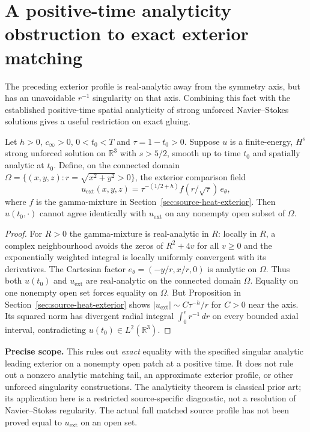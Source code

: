 
\section{A positive-time analyticity obstruction to exact exterior matching}
\label{sec:analytic-no-exact-gluing}
The preceding exterior profile is real-analytic away from the symmetry
axis, but has an unavoidable $r^{-1}$ singularity on that axis.
Combining this fact with the established positive-time spatial
analyticity of strong unforced Navier--Stokes solutions
\cite{zhang2026analyticity} gives a useful restriction on exact gluing.

\begin{theorem}
Let $h>0$, $c_\infty>0$, $0<t_0<T$ and $\tau=1-t_0>0$.
Suppose $u$ is a finite-energy, $H^s$ strong unforced solution
on $\mathbb R^3$ with $s>5/2$, smooth up to time $t_0$ and
spatially analytic at $t_0$. Define, on the connected domain
$\Omega=\{(x,y,z):r=\sqrt{x^2+y^2}>0\}$, the exterior comparison field
\[
u_{\mathrm{ext}}(x,y,z)=
\tau^{-(1/2+h)} f(r/\sqrt\tau)\,e_\theta,
\]
where $f$ is the gamma-mixture in Section~\ref{sec:source-heat-exterior}.
Then $u(t_0,\cdot)$ cannot agree identically with
$u_{\mathrm{ext}}$ on any nonempty open subset of $\Omega$.
\end{theorem}
\begin{proof}
For $R>0$ the gamma-mixture is real-analytic in $R$:
locally in $R$, a complex neighbourhood avoids the zeros of
$R^2+4v$ for all $v\ge0$ and the exponentially weighted integral
is locally uniformly convergent with its derivatives. The Cartesian
factor $e_\theta=(-y/r,x/r,0)$ is analytic on $\Omega$.
Thus both $u(t_0)$ and $u_{\mathrm{ext}}$ are real-analytic
on the connected domain $\Omega$.
Equality on one nonempty open set forces equality on $\Omega$.
But Proposition in Section~\ref{sec:source-heat-exterior} shows
$|u_{\mathrm{ext}}|\sim C\tau^{-h}/r$ for $C>0$ near the axis.
Its squared norm has divergent radial integral
$\int_0^\epsilon r^{-1}\,dr$ on every bounded axial interval,
contradicting $u(t_0)\in L^2(\mathbb R^3)$.
\end{proof}

\noindent\textbf{Precise scope.}
This rules out \emph{exact} equality with the specified
singular analytic leading exterior on a nonempty open patch
at a positive time. It does not rule out a nonzero analytic
matching tail, an approximate exterior profile, or other
unforced singularity constructions. The analyticity theorem is
classical prior art; its application here is a restricted
source-specific diagnostic, not a resolution of Navier--Stokes
regularity. The actual full matched source profile has not
been proved equal to $u_{\mathrm{ext}}$ on an open set.
